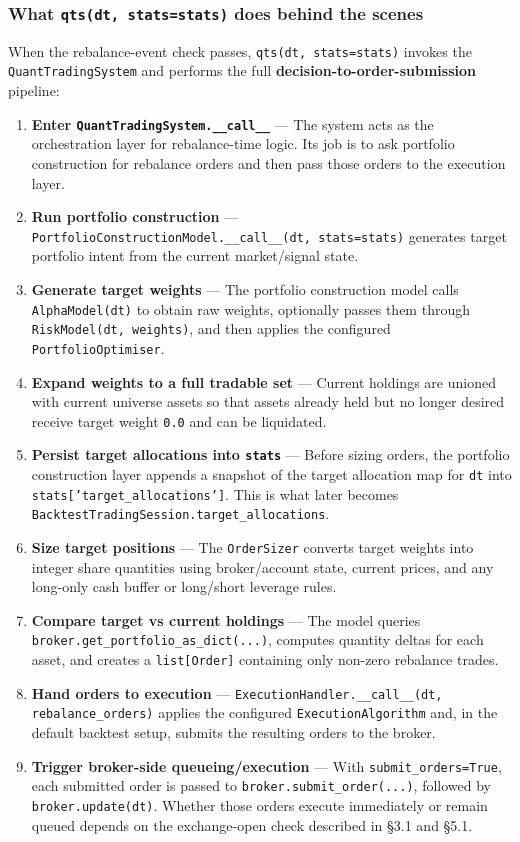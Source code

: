 \documentclass[11pt]{article}
\begin{document}
\subsubsection{What \texttt{qts(dt, stats=stats)} does behind the scenes}

When the rebalance-event check passes, \texttt{qts(dt, stats=stats)} invokes the \texttt{QuantTradingSystem} and performs the full \textbf{decision-to-order-submission} pipeline:

\begin{enumerate}[leftmargin=*]
  \item \textbf{Enter \texttt{QuantTradingSystem.\_\_call\_\_}} --- The system acts as the orchestration layer for rebalance-time logic. Its job is to ask portfolio construction for rebalance orders and then pass those orders to the execution layer.
  \item \textbf{Run portfolio construction} --- \texttt{PortfolioConstructionModel.\_\_call\_\_(dt, stats=stats)} generates target portfolio intent from the current market/signal state.
  \item \textbf{Generate target weights} --- The portfolio construction model calls \texttt{AlphaModel(dt)} to obtain raw weights, optionally passes them through \texttt{RiskModel(dt, weights)}, and then applies the configured \texttt{PortfolioOptimiser}.
  \item \textbf{Expand weights to a full tradable set} --- Current holdings are unioned with current universe assets so that assets already held but no longer desired receive target weight \texttt{0.0} and can be liquidated.
  \item \textbf{Persist target allocations into \texttt{stats}} --- Before sizing orders, the portfolio construction layer appends a snapshot of the target allocation map for \texttt{dt} into \texttt{stats['target\_allocations']}. This is what later becomes \texttt{BacktestTradingSession.target\_allocations}.
  \item \textbf{Size target positions} --- The \texttt{OrderSizer} converts target weights into integer share quantities using broker/account state, current prices, and any long-only cash buffer or long/short leverage rules.
  \item \textbf{Compare target vs current holdings} --- The model queries \texttt{broker.get\_portfolio\_as\_dict(...)}, computes quantity deltas for each asset, and creates a \texttt{list[Order]} containing only non-zero rebalance trades.
  \item \textbf{Hand orders to execution} --- \texttt{ExecutionHandler.\_\_call\_\_(dt, rebalance\_orders)} applies the configured \texttt{ExecutionAlgorithm} and, in the default backtest setup, submits the resulting orders to the broker.
  \item \textbf{Trigger broker-side queueing/execution} --- With \texttt{submit\_orders=True}, each submitted order is passed to \texttt{broker.submit\_order(...)}, followed by \texttt{broker.update(dt)}. Whether those orders execute immediately or remain queued depends on the exchange-open check described in \S3.1 and \S5.1.
\end{enumerate}
\end{document}
